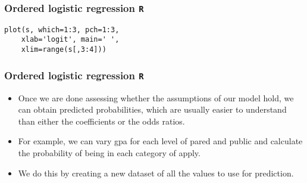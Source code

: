 \documentclass[00-GLMregslides.tex]{subfiles}
\begin{document}

\begin{frame}[fragile]
\frametitle{Ordered logistic regression \texttt{R} }
\Large
\begin{framed}
\begin{verbatim}
plot(s, which=1:3, pch=1:3, 
    xlab='logit', main=' ', 
    xlim=range(s[,3:4]))
\end{verbatim}
\end{framed}
\end{frame}

\begin{frame}[fragile]
	\frametitle{Ordered logistic regression \texttt{R} }
	\Large
	

\begin{itemize}
\item Once we are done assessing whether the assumptions of our model hold, we can obtain predicted probabilities, which are usually easier to understand than either the coefficients or the odds ratios. 

\item For example, we can vary gpa for each level of pared and public and calculate the probability of being in each category of apply. 
\item We do this by creating a new dataset of all the values to use for prediction.
\end{itemize}
\end{frame}
\end{document}
